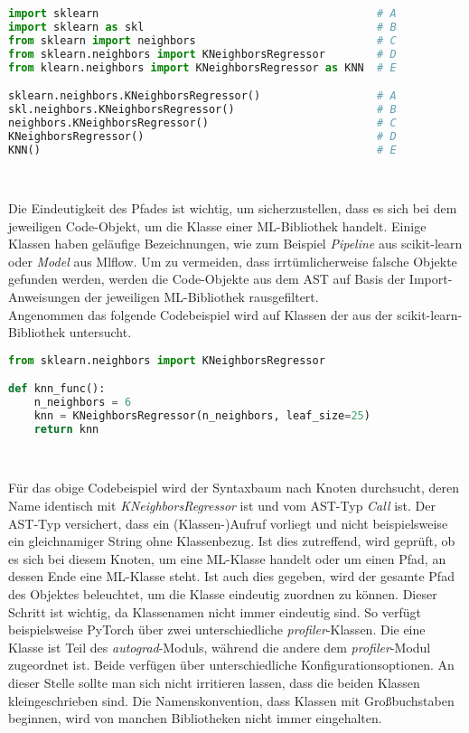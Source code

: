 \documentclass[german,bachelor]{swsLeipzig}
\begin{document}
\begin{lstlisting}[language=Python, frame=single, basicstyle=\small]
import sklearn                                           # A
import sklearn as skl                                    # B
from sklearn import neighbors                            # C
from sklearn.neighbors import KNeighborsRegressor        # D
from klearn.neighbors import KNeighborsRegressor as KNN  # E

sklearn.neighbors.KNeighborsRegressor()                  # A
skl.neighbors.KNeighborsRegressor()                      # B
neighbors.KNeighborsRegressor()                          # C
KNeighborsRegressor()                                    # D
KNN()                                                    # E
\end{lstlisting}
\

Die Eindeutigkeit des Pfades ist wichtig, um sicherzustellen, dass es sich bei dem jeweiligen Code-Objekt, um die Klasse
einer ML-Bibliothek handelt.
Einige Klassen haben geläufige Bezeichnungen, wie zum Beispiel \textit{Pipeline} aus scikit-learn oder \textit{Model} aus Mlflow.
Um zu vermeiden, dass irrtümlicherweise falsche Objekte gefunden werden, werden die Code-Objekte aus dem AST auf Basis der
Import-Anweisungen der jeweiligen ML-Bibliothek rausgefiltert.\\

Angenommen das folgende Codebeispiel wird auf Klassen der aus der scikit-learn-Bibliothek untersucht.\\

\begin{lstlisting}[language=Python, frame=single, basicstyle=\small]
from sklearn.neighbors import KNeighborsRegressor

def knn_func():
    n_neighbors = 6
    knn = KNeighborsRegressor(n_neighbors, leaf_size=25)
    return knn
\end{lstlisting}
\

Für das obige Codebeispiel wird der Syntaxbaum nach Knoten durchsucht, deren Name identisch mit \textit{KNeighborsRegressor} ist und
vom AST-Typ \textit{Call} ist.
Der AST-Typ versichert, dass ein (Klassen-)Aufruf vorliegt und nicht beispielsweise ein gleichnamiger String ohne Klassenbezug.
Ist dies zutreffend, wird geprüft, ob es sich bei diesem Knoten, um eine ML-Klasse handelt oder um einen Pfad, an dessen Ende eine ML-Klasse steht.
Ist auch dies gegeben, wird der gesamte Pfad des Objektes beleuchtet, um die Klasse eindeutig zuordnen zu können.
Dieser Schritt ist wichtig, da Klassenamen nicht immer eindeutig sind.
So verfügt beispielsweise PyTorch über zwei unterschiedliche \textit{profiler}-Klassen.
Die eine Klasse ist Teil des \textit{autograd}-Moduls, während die andere dem \textit{profiler}-Modul zugeordnet ist.
Beide verfügen über unterschiedliche Konfigurationsoptionen.
An dieser Stelle sollte man sich nicht irritieren lassen, dass die beiden Klassen kleingeschrieben sind.
Die Namenskonvention, dass Klassen mit Großbuchstaben beginnen, wird von manchen Bibliotheken nicht immer eingehalten.\\
\end{document}

